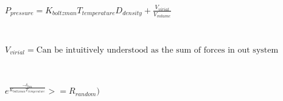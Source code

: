 \documentclass[12pt]{article}
\begin{document}
$P_{pressure} = K_{boltzman}T_{temperature}D_{density} +
\frac{V_{virial}}{V_{volume}} $

\,

$V_{virial}=\textrm{Can be intuitively understood as the sum of forces in out system}$

\,

$e^{\frac{-\delta_{tau}}{K_{boltzman}T_{temperature}}} >= R_{random}) $
\end{document}
